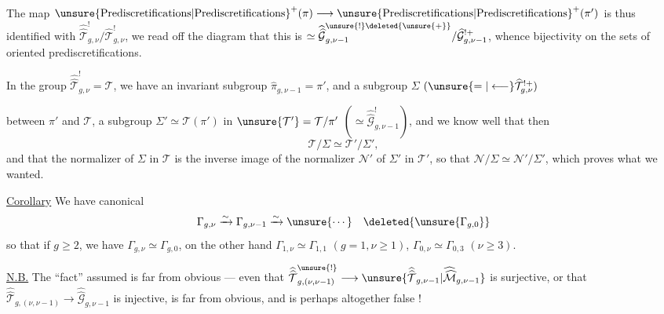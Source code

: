 The map $\unsure{\text{Prediscretifications}|\text{Prediscretifications}}^{+}(\pi)\longrightarrow
\unsure{\text{Prediscretifications}|\text{Prediscretifications}}^{+}(\pi')$ is thus identified with
$\widehat{\widehat{\mathcal T}}_{g,\nu}^{!}/\widehat{\mathcal T}_{g,\nu}^{!}$,
we read off the diagram that this is
$\simeq\widehat{\widehat{\mathcal G}}_{g,\nu-1}^{\unsure{!}\deleted{\unsure{+}}}/
\widehat{\mathcal G}_{g,\nu-1}^{!+}$,
whence bijectivity on the sets of oriented prediscretifications.

In the group $\widehat{\widehat{\mathcal T}}_{g,\nu}^{!}=\mathcal T$,
we have an invariant subgroup $\widehat{\pi}_{g,\nu-1}=\pi'$,
and a subgroup $\Sigma$ $(\unsure{=|\longleftarrow}\widehat{\mathcal T}_{g,\nu}^{!+})$


between $\pi'$ and $\mathcal T$,   a subgroup $\Sigma'\simeq\mathcal T(\pi')$ in $\unsure{\mathcal T'}=\mathcal T/\pi'$ $(\simeq\widehat{\widehat{\mathcal G}}^{!}_{g,\nu-1})$, and we know well that then
\[
\mathcal T/\Sigma\simeq\mathcal T'/\Sigma',
\]
and  that the normalizer  of $\Sigma$ in $\mathcal T$ is the inverse image of the normalizer $\mathcal N'$ of $\Sigma'$ in $\mathcal T'$, so that $\mathcal N/\Sigma\simeq\mathcal N'/\Sigma'$, which proves what we wanted.

\uline{Corollary} We have canonical 
\[
\Gamma_{g,\nu}\xrightarrow{\sim}\Gamma_{g,\nu-1}\xrightarrow{\sim}\unsure{\cdots}\quad\deleted{\unsure{\Gamma_{g,0}}}
\]
so that if $g\geq2$, we have  $\Gamma_{g,\nu}\simeq\Gamma_{g,0}$, on the other hand $\Gamma_{1,\nu}\simeq\Gamma_{1,1}$ $(g=1,\nu\geq1)$, $\Gamma_{0,\nu}\simeq\Gamma_{0,3}$ $(\nu\geq3)$.

\uline{N.B.} The ``fact''  assumed is far from obvious --- even that $\widehat{\widehat{\mathcal T}}^{\unsure{!}}_{g,(\nu,\nu-1)}\longrightarrow\unsure{\widehat{\widehat{\mathcal T}}_{g,\nu-1}|\widehat{\widehat{\mathcal M}}_{g,\nu-1}}$ is surjective, or that $\widehat{\widehat{\mathcal T}}_{g,(\nu,\nu-1)}\longrightarrow\widehat{\widehat{\mathcal G}}_{g,\nu-1}$ is injective, is far from obvious, and is perhaps altogether false !

